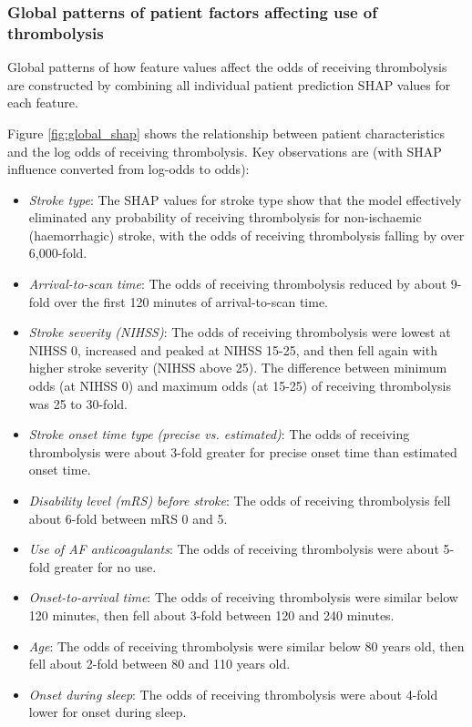 \subsubsection{Global patterns of patient factors affecting use of thrombolysis}

Global patterns of how feature values affect the odds of receiving thrombolysis are constructed by combining all individual patient prediction SHAP values for each feature. 

Figure \ref{fig:global_shap} shows the relationship between patient characteristics and the log odds of receiving thrombolysis. Key observations are (with SHAP influence converted from log-odds to odds):

\begin{itemize}
    \item \emph{Stroke type}: The SHAP values for stroke type show that the model effectively eliminated any probability of receiving thrombolysis for non-ischaemic (haemorrhagic) stroke, with the odds of receiving thrombolysis falling by over 6,000-fold.
    \item \emph{Arrival-to-scan time}: The odds of receiving thrombolysis reduced by about 9-fold over the first 120 minutes of arrival-to-scan time.
    \item \emph{Stroke severity (NIHSS)}: The odds of receiving thrombolysis were lowest at NIHSS 0, increased and peaked at NIHSS 15-25, and then fell again with higher stroke severity (NIHSS above 25). The difference between minimum odds (at NIHSS 0) and maximum odds (at 15-25) of receiving thrombolysis was 25 to 30-fold.
    \item \emph{Stroke onset time type (precise vs. estimated)}: The odds of receiving thrombolysis were about 3-fold greater for precise onset time than estimated onset time.
    \item \emph{Disability level (mRS) before stroke}: The odds of receiving thrombolysis fell about 6-fold between mRS 0 and 5.
    \item \emph{Use of AF anticoagulants}: The odds of receiving thrombolysis were about 5-fold greater for no use.
    \item \emph{Onset-to-arrival time}: The odds of receiving thrombolysis were similar below 120 minutes, then fell about 3-fold between 120 and 240 minutes.
    \item \emph{Age}: The odds of receiving thrombolysis were similar below 80 years old, then fell about 2-fold between 80 and 110 years old.    
    \item \emph{Onset during sleep}: The odds of receiving thrombolysis were about 4-fold lower for onset during sleep.
\end{itemize}

